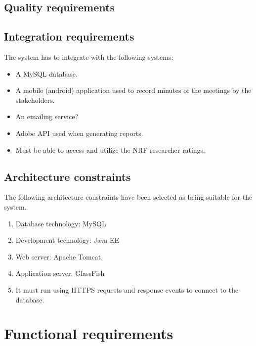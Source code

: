\documentclass[12pt]{article}
\begin{document}
		\vspace{0.2in}
		
		\subsection{Quality requirements} %
		\vspace{0.2in}
		
		\vspace{0.2in}
		
		\subsection{Integration requirements} %
		\vspace{0.2in}
		The system has to integrate with the following systems:
		\begin{itemize}
			\item A MySQL database.
			\item A mobile (android) application used to record minutes of the meetings by the stakeholders. 
			\item An emailing service? %
			\item Adobe API used when generating reports.
			\item Must be able to access and utilize the NRF researcher ratings.
		\end{itemize}
		\vspace{0.2in}
		
		\subsection{Architecture constraints} %
		\vspace{0.2in}
		The following architecture constraints have been selected as being suitable for the system.
		\begin{enumerate}
			\item Database technology: MySQL
			\item Development technology: Java EE
			\item Web server: Apache Tomcat.
			\item Application server: GlassFish 
			\item It must run using HTTPS requests and response events to connect to the
database.
		\end{enumerate}
		\vspace{0.5in}
	
	\newpage	
	\section{Functional requirements}
\end{document}
